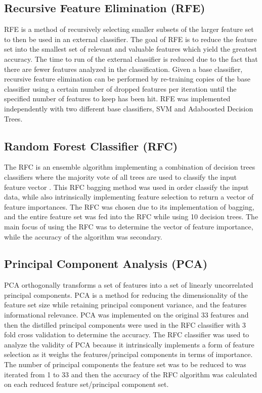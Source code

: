 \documentclass{article}\raggedbottom
\begin{document}
\subsection{Recursive Feature Elimination (RFE)}
RFE is a method of recursively selecting smaller subsets of the larger feature set to then be used in an external classifier. The goal of RFE is to reduce the feature set into the smallest set of relevant and valuable features which yield the greatest accuracy. The time to run of the external classifier is reduced due to the fact that there are fewer features analyzed in the classification.
Given a base classifier, recursive feature elimination can be performed by re-training copies of the base classifier using a certain number of dropped features per iteration until the specified number of features to keep has been hit. RFE was implemented independently with two different base classifiers, SVM and Adaboosted Decision Trees.

\subsection{Random Forest Classifier (RFC)}
The RFC is an ensemble algorithm implementing a combination of decision trees classifiers where the majority vote of all trees are used to classify the input feature vector \cite{pal2005random}. This RFC bagging method was used in order classify the input data, while also intrinsically implementing feature selection to return a vector of feature importances. The RFC was chosen due to its implementation of bagging, and the entire feature set was fed into the RFC while using 10 decision trees. The main focus of using the RFC was to determine the vector of feature importance, while the accuracy of the algorithm was secondary.

\subsection{Principal Component Analysis (PCA)}
PCA orthogonally transforms a set of features into a set of linearly uncorrelated principal components. PCA is a method for reducing the dimensionality of the feature set size while retaining principal component variance, and the features informational relevance. PCA was implemented on the original 33 features and then the distilled principal components were used in the RFC classifier with 3 fold cross validation to determine the accuracy. The RFC classifier was used to analyze the validity of PCA because it intrinsically implements a form of feature selection as it weighs the features/principal components in terms of importance. The number of principal components the feature set was to be reduced to was iterated from 1 to 33 and then the accuracy of the RFC algorithm was calculated on each reduced feature set/principal component set.
\end{document}
